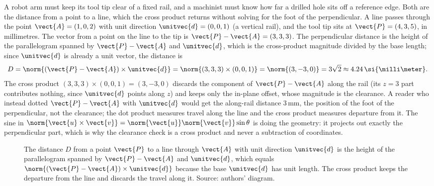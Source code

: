\begin{example}
A robot arm must keep its tool tip clear of a fixed rail, and a
machinist must know how far a drilled hole sits off a reference edge.
Both are the distance from a point to a line, which the cross product
returns without solving for the foot of the perpendicular. A line
passes through the point $\vect{A} = (1, 0, 2)$ with unit direction
$\unitvec{d} = (0, 0, 1)$ (a vertical rail), and the tool tip sits at
$\vect{P} = (4, 3, 5)$, in millimetres. The vector from a point on the
line to the tip is $\vect{P} - \vect{A} = (3, 3, 3)$. The perpendicular
distance is the height of the parallelogram spanned by $\vect{P} -
\vect{A}$ and $\unitvec{d}$, which is the cross-product magnitude
divided by the base length; since $\unitvec{d}$ is already a unit
vector, the distance is
\[
D = \norm{(\vect{P} - \vect{A})\times\unitvec{d}} =
\norm{(3, 3, 3)\times(0, 0, 1)} = \norm{(3, -3, 0)} = 3\sqrt{2}
\approx 4.24\,\si{\milli\meter}.
\]
The cross product $(3, 3, 3)\times(0, 0, 1) = (3, -3, 0)$ discards the
component of $\vect{P} - \vect{A}$ along the rail (its $z = 3$ part
contributes nothing, since $\unitvec{d}$ points along $z$) and keeps
only the in-plane offset, whose magnitude is the clearance. A reader
who instead dotted $\vect{P} - \vect{A}$ with $\unitvec{d}$ would get
the along-rail distance $3\,\si{\milli\meter}$, the position of the
foot of the perpendicular, not the clearance; the dot product measures
travel along the line and the cross product measures departure from it.
The sine in $\norm{\vect{u}\times\vect{v}} = \norm{\vect{u}}
\norm{\vect{v}}\sin\theta$ is doing the geometry: it projects out
exactly the perpendicular part, which is why the clearance check is a
cross product and never a subtraction of coordinates.
\end{example}

\begin{figure}[h]
  \centering
  
  \caption[Distance from a point to a line by the cross product.]{The
  distance $D$ from a point $\vect{P}$ to a line through $\vect{A}$ with
  unit direction $\unitvec{d}$ is the height of the parallelogram
  spanned by $\vect{P} - \vect{A}$ and $\unitvec{d}$, which equals
  $\norm{(\vect{P} - \vect{A})\times\unitvec{d}}$ because the base
  $\unitvec{d}$ has unit length. The cross product keeps the departure
  from the line and discards the travel along it. Source: authors'
  diagram.}
  \label{fig:vol02ch08:point-line-distance}
\end{figure}

